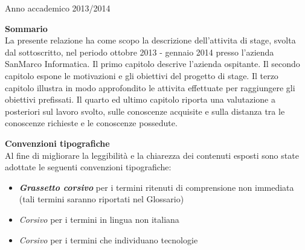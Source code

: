 \documentclass[10pt, a4paper, oneside]{Thesis} %
\begin{document}
\begin{titlepage}
\begin{center}
{\large Anno accademico 2013/2014}\\[4cm] %

 
\vfill
\end{center}

\end{titlepage}





\clearpage
\newpage
\thispagestyle{empty}
\mbox{}
\clearpage

\vspace*{7cm}
\begin{centering}
\textbf{Sommario}\\


La presente relazione ha come scopo la descrizione dell'attivita di stage, svolta dal sottoscritto,
nel periodo ottobre 2013 - gennaio 2014 presso l'azienda SanMarco Informatica. Il primo capitolo descrive l'azienda
ospitante. Il secondo capitolo espone le motivazioni e gli obiettivi del progetto di stage. Il terzo
capitolo illustra in modo approfondito le attivita effettuate per raggiungere gli obiettivi prefissati.
Il quarto ed ultimo capitolo riporta una valutazione a posteriori sul lavoro svolto, sulle conoscenze
acquisite e sulla distanza tra le conoscenze richieste e le conoscenze possedute.
\end{centering}

\clearpage
\textbf{Convenzioni tipografiche}\\


Al fine di migliorare la leggibilità e la chiarezza dei contenuti esposti sono state adottate le seguenti
convenzioni tipografiche:

\begin{itemize}
  \item \textbf{\textit{Grassetto corsivo}} per i termini ritenuti di comprensione non immediata (tali termini saranno riportati nel Glossario)
  \item \textit{Corsivo} per i termini in lingua non italiana
  \item \textit{Corsivo} per i termini che individuano tecnologie
\end{itemize}

\clearpage %

\end{document}
